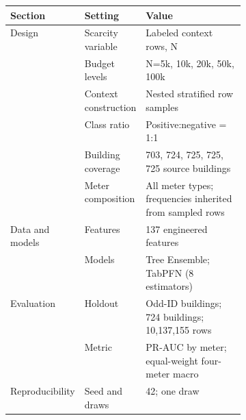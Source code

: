 \documentclass[10pt]{article}
\begin{document}
\begin{preview}\begin{minipage}{\linewidth}
\centering
{}
\label{tab:m5-exp-a-setup}
\begin{tabularx}{\linewidth}{p{0.17\linewidth}p{0.23\linewidth}X}
\toprule
Section & Setting & Value \\
\midrule
Design & Scarcity variable & Labeled context rows, N \\
 & Budget levels & N=5k, 10k, 20k, 50k, 100k \\
 & Context construction & Nested stratified row samples \\
 & Class ratio & Positive:negative = 1:1 \\
 & Building coverage & 703, 724, 725, 725, 725 source buildings \\
 & Meter composition & All meter types; frequencies inherited from sampled rows \\
\addlinespace[2pt]
Data and models & Features & 137 engineered features \\
 & Models & Tree Ensemble; TabPFN (8 estimators) \\
\addlinespace[2pt]
Evaluation & Holdout & Odd-ID buildings; 724 buildings; 10,137,155 rows \\
 & Metric & PR-AUC by meter; equal-weight four-meter macro \\
\addlinespace[2pt]
Reproducibility & Seed and draws & 42; one draw \\
\bottomrule
\end{tabularx}
\end{minipage}\end{preview}
\end{document}
